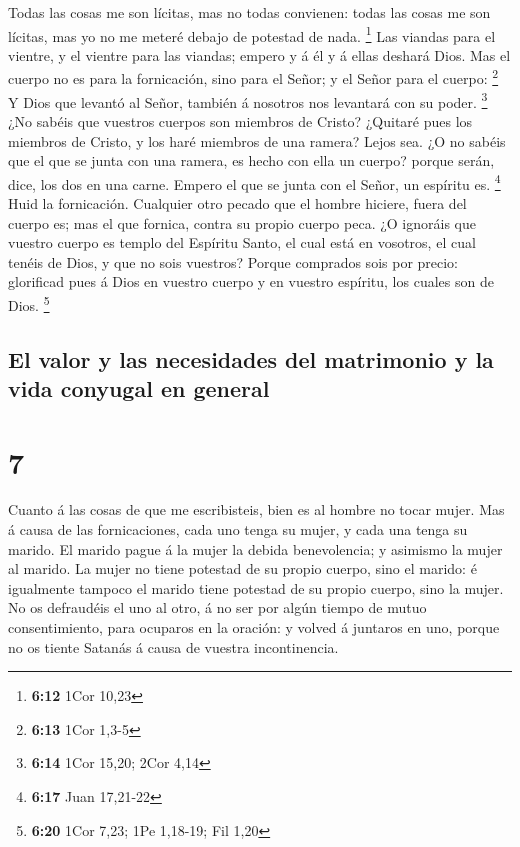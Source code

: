  Todas las cosas me son lícitas, mas no todas convienen:
todas las cosas me son lícitas, mas yo no me meteré debajo de potestad
de nada. \footnote{\textbf{6:12} 1Cor 10,23}  Las viandas
para el vientre, y el vientre para las viandas; empero y á él y á ellas
deshará Dios. Mas el cuerpo no es para la fornicación, sino para el
Señor; y el Señor para el cuerpo: \footnote{\textbf{6:13} 1Cor 1,3-5}
 Y Dios que levantó al Señor, también á nosotros nos
levantará con su poder. \footnote{\textbf{6:14} 1Cor 15,20; 2Cor 4,14}
 ¿No sabéis que vuestros cuerpos son miembros de Cristo?
¿Quitaré pues los miembros de Cristo, y los haré miembros de una ramera?
Lejos sea.  ¿O no sabéis que el que se junta con una
ramera, es hecho con ella un cuerpo? porque serán, dice, los dos en una
carne.  Empero el que se junta con el Señor, un espíritu
es. \footnote{\textbf{6:17} Juan 17,21-22}  Huid la
fornicación. Cualquier otro pecado que el hombre hiciere, fuera del
cuerpo es; mas el que fornica, contra su propio cuerpo peca.
 ¿O ignoráis que vuestro cuerpo es templo del Espíritu
Santo, el cual está en vosotros, el cual tenéis de Dios, y que no sois
vuestros?  Porque comprados sois por precio: glorificad
pues á Dios en vuestro cuerpo y en vuestro espíritu, los cuales son de
Dios. \footnote{\textbf{6:20} 1Cor 7,23; 1Pe 1,18-19; Fil 1,20}

\hypertarget{el-valor-y-las-necesidades-del-matrimonio-y-la-vida-conyugal-en-general}{%
\subsection{El valor y las necesidades del matrimonio y la vida conyugal
en
general}\label{el-valor-y-las-necesidades-del-matrimonio-y-la-vida-conyugal-en-general}}

\hypertarget{section-6}{%
\section{7}\label{section-6}}

 Cuanto á las cosas de que me escribisteis, bien es al
hombre no tocar mujer.  Mas á causa de las fornicaciones,
cada uno tenga su mujer, y cada una tenga su marido.  El
marido pague á la mujer la debida benevolencia; y asimismo la mujer al
marido.  La mujer no tiene potestad de su propio cuerpo,
sino el marido: é igualmente tampoco el marido tiene potestad de su
propio cuerpo, sino la mujer.  No os defraudéis el uno al
otro, á no ser por algún tiempo de mutuo consentimiento, para ocuparos
en la oración: y volved á juntaros en uno, porque no os tiente Satanás á
causa de vuestra incontinencia.

